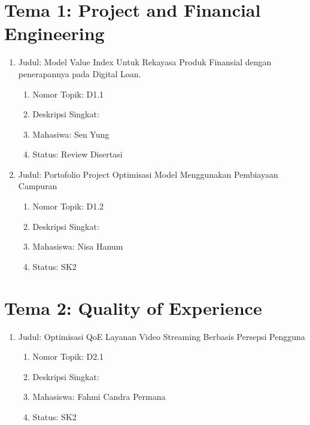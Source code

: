 \documentclass[
  letterpaper,
  DIV=11,
  numbers=noendperiod]{scrreprt}
\begin{document}
\section{Tema 1: Project and Financial
Engineering}\label{tema-1-project-and-financial-engineering-3}

\begin{enumerate}
\def\labelenumi{\arabic{enumi}.}
\item
  Judul: Model Value Index Untuk Rekayasa Produk Finansial dengan
  penerapannya pada Digital Loan.

  \begin{enumerate}
  \def\labelenumii{\arabic{enumii}.}
  \item
    Nomor Topik: D1.1
  \item
    Deskripsi Singkat:
  \item
    Mahasiwa: Sen Yung
  \item
    Status: Review Disertasi
  \end{enumerate}
\item
  Judul: Portofolio Project Optimisasi Model Menggunakan Pembiayaan
  Campuran

  \begin{enumerate}
  \def\labelenumii{\arabic{enumii}.}
  \item
    Nomor Topik: D1.2
  \item
    Deskripsi Singkat:
  \item
    Mahasiswa: Nisa Hanum
  \item
    Status: SK2
  \end{enumerate}
\end{enumerate}

\section{Tema 2: Quality of
Experience}\label{tema-2-quality-of-experience-3}

\begin{enumerate}
\def\labelenumi{\arabic{enumi}.}
\item
  Judul: Optimisasi QoE Layanan Video Streaming Berbasis Persepsi
  Pengguna

  \begin{enumerate}
  \def\labelenumii{\arabic{enumii}.}
  \item
    Nomor Topik: D2.1
  \item
    Deskripsi Singkat:
  \item
    Mahasiswa: Fahmi Candra Permana
  \item
    Status: SK2
  \end{enumerate}
\end{enumerate}
\end{document}
